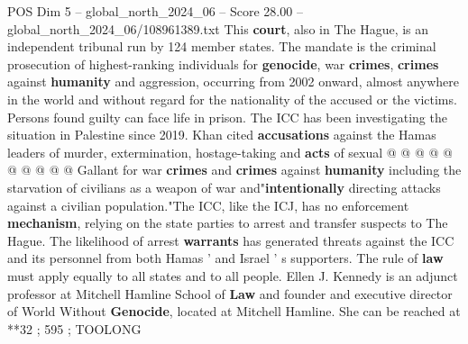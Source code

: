 \begin{textsample}{POS Dim 5 – global\_north\_2024\_06 – Score 28.00 – global\_north\_2024\_06/108961389.txt}
This \textbf{court}, also in The Hague, is an independent tribunal run by 124 member states.
The mandate is the criminal prosecution of highest-ranking individuals for \textbf{genocide}, war \textbf{crimes}, \textbf{crimes} against \textbf{humanity} and aggression, occurring from 2002 onward, almost anywhere in the world and without regard for the nationality of the accused or the victims.
Persons found guilty can face life in prison.
The ICC has been investigating the situation in Palestine since 2019.
Khan cited \textbf{accusations} against the Hamas leaders of murder, extermination, hostage-taking and \textbf{acts} of sexual @ @ @ @ @ @ @ @ @ @ Gallant for war \textbf{crimes} and \textbf{crimes} against \textbf{humanity} including the starvation of civilians as a weapon of war and"\textbf{intentionally} directing attacks against a civilian population."The ICC, like the ICJ, has no enforcement \textbf{mechanism}, relying on the state parties to arrest and transfer suspects to The Hague.
The likelihood of arrest \textbf{warrants} has generated threats against the ICC and its personnel from both Hamas ' and Israel ' s supporters.
The rule of \textbf{law} must apply equally to all states and to all people.
Ellen J.
Kennedy is an adjunct professor at Mitchell Hamline School of \textbf{Law} and founder and executive director of World Without \textbf{Genocide}, located at Mitchell Hamline.
She can be reached at **32 ; 595 ; TOOLONG

\end{textsample}
